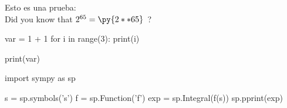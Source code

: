 \documentclass[12pt,a4paper]{article}
\begin{document}
Esto es una prueba: \\
Did you know that $2^{65} = \py{2**65}$\ ? 
\begin{pyconsole}
var = 1 + 1
for i in range(3):
	print(i)

print(var)
\end{pyconsole}

\begin{pyconsole}
import sympy as sp

s = sp.symbols('s')
f = sp.Function('f')
exp = sp.Integral(f(s))
sp.pprint(exp)
\end{pyconsole}

\begin{pycode}

\end{pycode}
\end{document}
